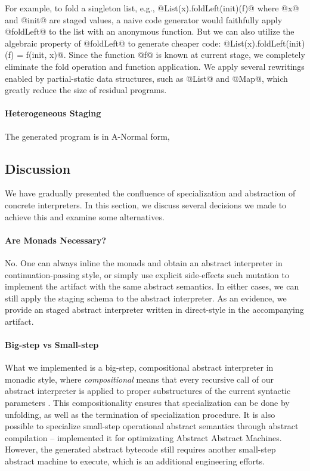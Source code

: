 For example, to fold a singleton list, e.g., @List(x).foldLeft(init)(f)@ where
@x@ and @init@ are staged values, a naive code generator would faithfully
apply @foldLeft@ to the list with an anonymous function. But we can also utilize
the algebraic property of @foldLeft@ to generate cheaper code:
@List(x).foldLeft(init)(f) = f(init, x)@.
Since the function @f@ is known at current stage, we completely eliminate the
fold operation and function application. We apply several rewritings enabled by
partial-static data structures, such as @List@ and @Map@, which greatly reduce
the size of residual programs.

\paragraph{Heterogeneous Staging} The generated program is in A-Normal form, 

\subsection{Discussion}

We have gradually presented the confluence of specialization and abstraction of
concrete interpreters. In this section, we discuss several decisions we made to
achieve this and examine some alternatives.

\paragraph{Are Monads Necessary?} No. One can always inline the monads and
obtain an abstract interpreter in continuation-passing style, or simply use
explicit side-effects such mutation to implement the artifact with the same
abstract semantics. In either cases, we can still apply the staging schema to
the abstract interpreter. As an evidence, we provide an staged abstract
interpreter written in direct-style in the accompanying artifact.

\paragraph{Big-step vs Small-step}

What we implemented is a big-step, compositional abstract interpreter in monadic
style, where \textit{compositional} means that every recursive call of our abstract
interpreter is applied to proper substructures of the current syntactic
parameters \cite{10.1007/3-540-61580-6_11}. This compositionality ensures that
specialization can be done by unfolding, as well as the termination of
specialization procedure. It is also possible to specialize small-step
operational abstract semantics through abstract compilation
\cite{Boucher:1996:ACN:647473.727587} --
\citet{Johnson:2013:OAA:2500365.2500604} implemented it for
optimizating Abstract Abstract Machines. However, the generated abstract
bytecode still requires another small-step abstract machine to execute, which is
an additional engineering efforts.

